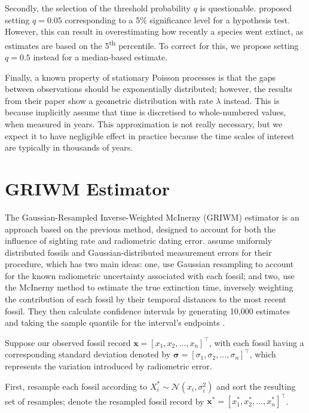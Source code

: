 Secondly, the selection of the threshold probability $q$ is questionable. \citet{Mcinerny2006} proposed setting $q = 0.05$ corresponding to a 5\% significance level for a hypothesis test. However, this can result in overestimating how recently a species went extinct, as estimates are based on the 5\textsuperscript{th} percentile. To correct for this, we propose setting $q = 0.5$ instead for a median-based estimate.

Finally, a known property of stationary Poisson processes is that the gaps between observations should be exponentially distributed; however, the results from their paper show a geometric distribution with rate $\lambda$ instead. This is because \citet{Mcinerny2006} implicitly assume that time is discretised to whole-numbered values, when measured in years. This approximation is not really necessary, but we expect it to have negligible effect in practice because the time scales of interest are typically in thousands of years.

\section{GRIWM Estimator}

The Gaussian-Resampled Inverse-Weighted McInerny (GRIWM) estimator is an approach based on the previous \citet{Mcinerny2006} method, designed to account for both the influence of sighting rate and radiometric dating error. \citet{Bradshaw2012} assume uniformly distributed fossils and Gaussian-distributed measurement errors for their procedure, which has two main ideas: one, use Gaussian resampling to account for the known radiometric uncertainty associated with each fossil; and two, use the McInerny method to estimate the true extinction time, inversely weighting the contribution of each fossil by their temporal distances to the most recent fossil. They then calculate confidence intervals by generating 10{\small,}000 estimates and taking the sample quantile for the interval's endpoints \cite{Bradshaw2012}.

Suppose our observed fossil record $\bm{x} = [x_1, x_2, \dots, x_n]^\top$, with each fossil having a corresponding standard deviation denoted by $\bm{\sigma}=[\sigma_1, \sigma_2, \dots, \sigma_n]^\top$, which represents the variation introduced by radiometric error.

First, resample each fossil according to $X^*_i \sim \mathcal{N}(x_i, \sigma_i^2)$ and sort the resulting set of resamples; denote the resampled fossil record by $\bm{x^*} = [x^*_1, x^*_2, \dots, x^*_n]^\top$.

